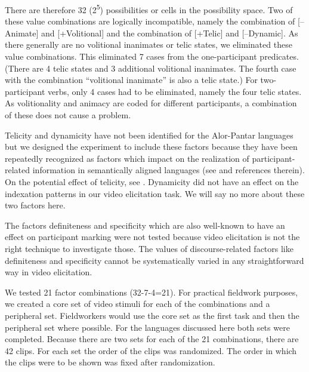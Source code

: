 There are therefore 32 (2\textsuperscript{5}) possibilities or cells in the possibility space. Two of these value combinations are logically incompatible, namely the combination of [--Animate] and [+Volitional] and the combination of [+Telic] and [--Dynamic]. As there generally are no volitional inanimates or telic states, we eliminated these value combinations. This eliminated 7 cases from the one-participant predicates. (There are 4 telic states and 3 additional volitional inanimates. The fourth case with the combination ``volitional inanimate'' is also a telic state.) For two-participant verbs, only 4 cases had to be eliminated, namely the four telic states. As volitionality and animacy are coded for different participants, a combination of these does not cause a problem. 

Telicity and dynamicity have not been identified for the Alor-Pantar languages but we designed the experiment to include these factors because they have been repeatedly recognized as factors which impact on the realization of participant-related information in semantically aligned languages (see \citet{Arkadiev2008} and references therein). On the potential effect of telicity, see \citet{FeddenEtAl2013}. Dynamicity did not have an effect on the indexation patterns in our video elicitation task. We will say no more about these two factors here.

  The factors definiteness  and specificity  which are also well-known to have an effect on participant marking \citep{Aissen2003} were not tested because video elicitation is not the right technique to investigate those. The values of discourse-related factors like definiteness and specificity cannot be systematically varied in any straightforward way in video elicitation.

We tested 21 factor combinations (32-7-4=21). For practical fieldwork purposes, we created a core set of video stimuli for each of the combinations and a peripheral set. Fieldworkers would use the core set as the first task and then the peripheral set where possible. For the languages discussed here both sets were completed. Because there are two sets for each of the 21 combinations, there are 42 clips. For each set the order of the clips was randomized. The order in which the clips were to be shown was fixed after randomization. 


